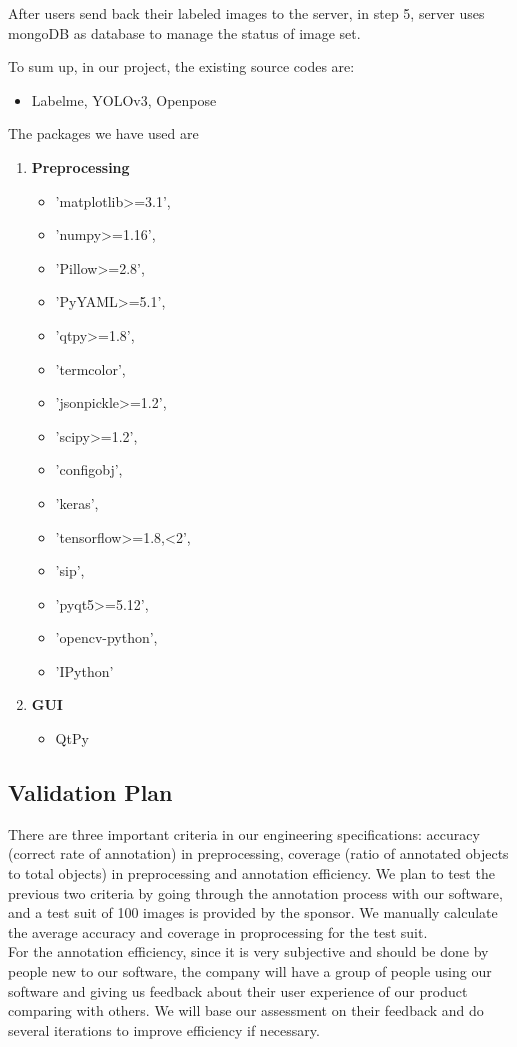 After users send back their labeled images to the server, in step 5, server uses mongoDB as database to manage the status of image set.

To sum up, in our project, the existing source codes are:
\begin{itemize}
    \item Labelme\cite{labelme}, YOLOv3\cite{Redmon2018YOLOv3}, Openpose\cite{Cao2016Realtime}
\end{itemize}
The packages we have used are 
\begin{enumerate}
    \item \textbf{Preprocessing} 
    \begin{itemize}
        \item     'matplotlib>=3.1',
         \item 'numpy>=1.16',
        \item  'Pillow>=2.8',
        \item  'PyYAML>=5.1',
    \item 'qtpy>=1.8',
    \item 'termcolor',
    \item 'jsonpickle>=1.2',
    \item 'scipy>=1.2',
     \item 'configobj',
     \item 'keras',
     \item 'tensorflow>=1.8,<2',
     \item 'sip',
     \item 'pyqt5>=5.12',
     \item 'opencv-python',
     \item 'IPython'
       \end{itemize}
    \item \textbf{GUI}
    \begin{itemize}
        \item QtPy
    \end{itemize}
\end{enumerate}
  


\subsection{Validation Plan}
There are three important criteria in our engineering specifications: accuracy (correct rate of annotation) in preprocessing, coverage (ratio of annotated objects to total objects) in preprocessing and annotation efficiency. 
We plan to test the previous two criteria by going through the annotation process with our software, and a test suit of 100 images is provided by the sponsor. We manually calculate the average accuracy and coverage in proprocessing for the test suit.\\
For the annotation efficiency, since it is very subjective and should be done by people new to our software, the company will have a group of people using our software and giving us feedback about their user experience of our product comparing with others. We will base our assessment on their feedback and do several iterations to improve efficiency if necessary.